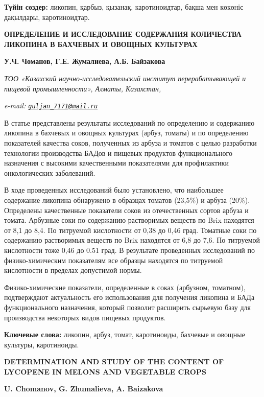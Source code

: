 {\bfseries Түйін сөздер:} ликопин, қарбыз, қызанақ, каротиноидтар, бақша
мен көкөніс дақылдары, каротиноидтар.

\begin{articleheader}
{\bfseries ОПРЕДЕЛЕНИЕ И ИССЛЕДОВАНИЕ СОДЕРЖАНИЯ КОЛИЧЕСТВА ЛИКОПИНА В БАХЧЕВЫХ И ОВОЩНЫХ КУЛЬТУРАХ}

{\bfseries
У.Ч. Чоманов,
Г.Е. Жумалиева\textsuperscript{\envelope },
А.Б. Байзакова}
\end{articleheader}

\begin{affiliation}
\emph{ТОО «Казахский научно-исследовательский институт перерабатывающей и пищевой промышленности», Алматы, Казахстан,}

\emph{e-mail: \href{mailto:guljan_7171@mail.ru}{\nolinkurl{guljan\_7171@mail.ru}}}
\end{affiliation}

В статье представлены результаты исследований по определению и
содержанию ликопина в бахчевых и овощных культурах (арбуз, томаты) и по
определению показателей качества соков, полученных из арбуза и томатов с
целью разработки технологии производства БАДов и пищевых продуктов
функционального назначения с высокими качественными показателями для
профилактики онкологических заболеваний.

В ходе проведенных исследований было установлено, что наибольшее
содержание ликопина обнаружено в образцах томатов (23,5\%) и арбуза
(20\%). Определены качественные показатели соков из отечественных сортов
арбуза и томата. Арбузные соки по содержанию растворимых веществ по Brix
находятся от 8,1 до 8,4. По титруемой кислотности от 0,38 до 0,46 град.
Томатные соки по содержанию растворимых веществ по Brix находятся от 6,8
до 7,6. По титруемой кислотности тоже 0,46 до 0.51 град. В результате
проведенных исследований по физико-химическим показателям все образцы
находятся по титруемой кислотности в пределах допустимой нормы.

Физико-химические показатели, определенные в соках (арбузном, томатном),
подтверждают актуальность его использования для получения ликопина и
БАДа функционального назначения, который позволит расширить сырьевую
базу для производства некоторых видов пищевых продуктов.

{\bfseries Ключевые слова:} ликопин, арбуз, томат, каротиноиды, бахчевые и
овощные культуры, каротиноиды.

\begin{articleheader}
{\bfseries DETERMINATION AND STUDY OF THE CONTENT OF LYCOPENE IN MELONS AND VEGETABLE CROPS}

{\bfseries
U. Chomanov,
G. Zhumalieva\textsuperscript{\envelope },
A. Baizakova}
\end{articleheader}

